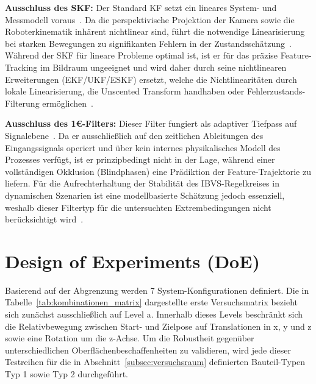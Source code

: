 \begin{listNorm}
    \item \textbf{Ausschluss des SKF:} Der Standard \ac{KF} setzt ein lineares System- und Messmodell voraus~\cite{kalman1960new}. Da die perspektivische Projektion der Kamera sowie die Roboterkinematik inhärent nichtlinear sind, führt die notwendige Linearisierung bei starken Bewegungen zu signifikanten Fehlern in der Zustandsschätzung~\cite{thrun2005probabilistic}. Während der SKF für lineare Probleme optimal ist, ist er für das präzise Feature-Tracking im Bildraum ungeeignet und wird daher durch seine nichtlinearen Erweiterungen (\ac{EKF}/\ac{UKF}/\ac{ESKF}) ersetzt, welche die Nichtlinearitäten durch lokale Linearisierung, die Unscented Transform handhaben oder Fehlerzustands-Filterung ermöglichen~\cite{julier1997new}.
    
    \item \textbf{Ausschluss des 1\euro{}-Filters:} Dieser Filter fungiert als adaptiver Tiefpass auf Signalebene~\cite{casiez20121euro}. Da er ausschließlich auf den zeitlichen Ableitungen des Eingangssignals operiert und über kein internes physikalisches Modell des Prozesses verfügt, ist er prinzipbedingt nicht in der Lage, während einer vollständigen Okklusion (Blindphasen) eine Prädiktion der Feature-Trajektorie zu liefern. Für die Aufrechterhaltung der Stabilität des \ac{IBVS}-Regelkreises in dynamischen Szenarien ist eine modellbasierte Schätzung jedoch essenziell, weshalb dieser Filtertyp für die untersuchten Extrembedingungen nicht berücksichtigt wird~\cite{casiez20121euro}.
    
\end{listNorm}

\section{Design of Experiments (DoE)}
\label{subsec:doe}
Basierend auf der Abgrenzung werden 7 System-Konfigurationen definiert. Die in Tabelle~\ref{tab:kombinationen_matrix} dargestellte erste Versuchsmatrix bezieht sich zunächst ausschließlich auf Level a. Innerhalb dieses Levels beschränkt sich die Relativbewegung zwischen Start- und Zielpose auf Translationen in x, y und z sowie eine Rotation um die z-Achse. Um die Robustheit gegenüber unterschiedlichen Oberflächenbeschaffenheiten zu validieren, wird jede dieser Testreihen für die in Abschnitt~\ref{subsec:versuchsraum} definierten Bauteil-Typen Typ 1 sowie Typ 2 durchgeführt.

